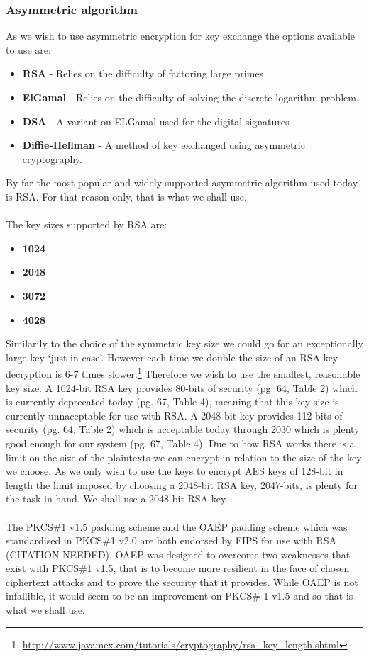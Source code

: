 \documentclass[12pt, titlepage]{article}
\begin{document}
\subsubsection*{Asymmetric algorithm}
As we wish to use asymmetric encryption for key exchange the options available to use are:
\begin{itemize}
	\item \textbf{RSA} - Relies on the difficulty of factoring large primes
	\item \textbf{ElGamal} - Relies on the difficulty of solving the discrete logarithm problem.
	\item \textbf{DSA} - A variant on ELGamal used for the digital signatures
	\item \textbf{Diffie-Hellman} - A method of key exchanged using asymmetric cryptography.
\end{itemize}
By far the most popular and widely supported asymmetric algorithm used today is RSA. For that reason only, that is what we shall use.
\\
\\
The key sizes supported by RSA are:
\begin{itemize}
	\item \textbf{1024}
	\item \textbf{2048}
	\item \textbf{3072}
	\item \textbf{4028}
\end{itemize}
Similarily to the choice of the symmetric key size we could go for an exceptionally large key `just in case'. However each time we double the size of an RSA key decryption is 6-7 times slower.\footnote{\url{http://www.javamex.com/tutorials/cryptography/rsa_key_length.shtml}}
Therefore we wish to use the smallest, reasonable key size. A 1024-bit RSA key provides 80-bits of security (pg. 64, Table 2) which is currently deprecated today (pg. 67, Table 4), meaning that this key size is currently unnaceptable for use with RSA. A 2048-bit key provides 112-bits of security (pg. 64, Table 2) which is acceptable today through 2030 which is plenty good enough for our system (pg. 67, Table 4).\cite{nistKeys}
\newline \indent Due to how RSA works there is a limit on the size of the plaintexts we can encrypt in relation to the size of the key we choose. As we only wish to use the keys to encrypt AES keys of 128-bit in length the limit imposed by choosing a 2048-bit RSA key, 2047-bits, is plenty for the task in hand.
\newline We shall use a 2048-bit RSA key.
\\
\\
The PKCS\#1 v1.5 padding scheme and the OAEP padding scheme which was standardised in PKCS\#1 v2.0 are both endorsed by FIPS for use with RSA (CITATION NEEDED). OAEP was designed to overcome two weaknesses that exist with PKCS\#1 v1.5, that is to become more resilient in the face of chosen ciphertext attacks and to prove the security that it provides. While OAEP is not infallible\cite{oaepAttack}, it would seem to be an improvement on PKCS\# 1 v1.5 and so that is what we shall use.
\end{document}
